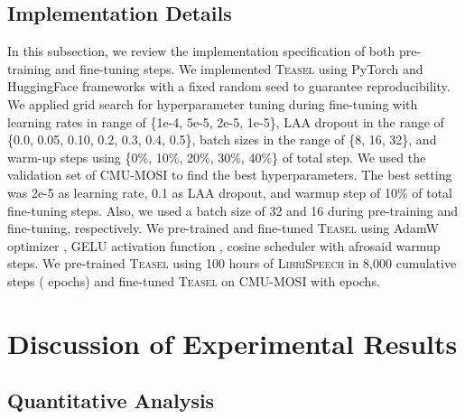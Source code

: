 \documentclass[letterpaper]{article} \usepackage{spconf,amsmath,graphicx}
\newcommand{\teasel}{\textsc{Teasel }}
\begin{document}
\subsection{Implementation Details}
In this subsection, we review the implementation specification of both pre-training and fine-tuning steps.  We implemented \teasel using PyTorch \cite{paszke2019pytorch} and HuggingFace frameworks \cite{wolf2019huggingface} with a fixed random seed to guarantee reproducibility. We applied grid search for hyperparameter tuning during fine-tuning with learning rates in range of \{1e-4, 5e-5, 2e-5, 1e-5\}, LAA dropout in the range of \{0.0, 0.05, 0.10, 0.2, 0.3, 0.4, 0.5\}, batch sizes in the range of \{8, 16, 32\}, and warm-up steps using \{0\%, 10\%, 20\%, 30\%, 40\%\} of total step. We used the validation set of CMU-MOSI to find the best hyperparameters. The best setting was 2e-5 as learning rate, 0.1 as LAA dropout, and warmup step of 10\% of total fine-tuning steps. Also, we used a batch size of 32 and 16 during pre-training and fine-tuning, respectively. We pre-trained and fine-tuned \teasel using AdamW optimizer \cite{loshchilov2017decoupled} , GELU activation function \cite{hendrycks2016gaussian}, cosine scheduler with afrosaid warmup steps. We pre-trained \teasel using 100 hours of \textsc{LibriSpeech} in 8,000 cumulative steps ( epochs) and fine-tuned \teasel on CMU-MOSI with  epochs. 


















\section{Discussion of Experimental Results}
\label{sec:results}
\subsection{Quantitative Analysis}
\end{document}
